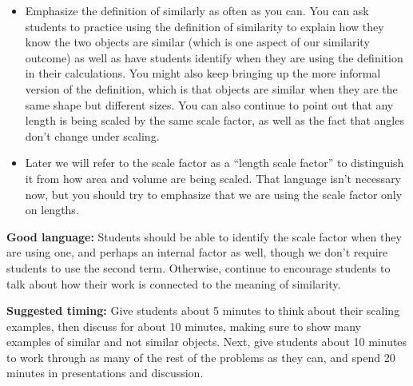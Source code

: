 \documentclass[noauthor,nooutcomes]{ximera}
\begin{document}
\begin{instructorNotes}
\begin{itemize}
 \item Emphasize the definition of similarly as often as you can. You can ask students to practice using the definition of similarity to explain how they know the two objects are similar (which is one aspect of our similarity outcome) as well as have students identify when they are using the definition in their calculations. You might also keep bringing up the more informal version of the definition, which is that objects are similar when they are the same shape but different sizes. You can also continue to point out that any length is being scaled by the same scale factor, as well as the fact that angles don't change under scaling.
 \item Later we will refer to the scale factor as a ``length scale factor'' to distinguish it from how area and volume are being scaled. That language isn't necessary now, but you should try to emphasize that we are using the scale factor only on lengths.
\end{itemize}








{\bf Good language:} Students should be able to identify the scale factor when they are using one, and perhaps an internal factor as well, though we don't require students to use the second term. Otherwise, continue to encourage students to talk about how their work is connected to the meaning of similarity.

{\bf Suggested timing:}  Give students about 5 minutes to think about their scaling examples, then discuss for about 10 minutes, making sure to show many examples of similar and not similar objects. Next, give students about 10 minutes to work through as many of the rest of the problems as they can, and spend 20 minutes in presentations and discussion.

\end{instructorNotes}
\end{document}
